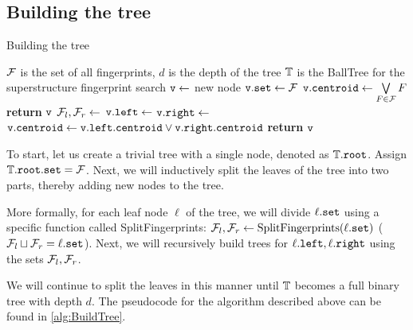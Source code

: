 \subsection{Building the tree}

\begin{algorithm}
  \caption{Building the tree} \label{alg:BuildTree}
  \begin{algorithmic}[1]
    \Require $\mathcal{F}$ is the set of all fingerprints, $d$ is the depth of the tree
    \Ensure $\mathbb{T} $ is the BallTree for the superstructure fingerprint search 
      \State ${\tt v} \gets$ new node
	\State ${\tt v.set} \gets \mathcal{F}$ 
	\State ${\tt v.centroid} \gets \bigvee\limits_{F \in \mathcal{F}} F$ 
	\State \textbf{return} ${\tt v}$ 
      \Else 
        \State $\mathcal{F}_l, \mathcal{F}_r \gets $ 
        \State ${\tt v.left} \gets $  
	\State ${\tt v.right} \gets $ 
	\State ${\tt v.centroid} \gets {\tt v.left.centroid} \lor {\tt v.right.centroid}$ 
        \State \textbf{return} ${\tt v}$ 
      \EndIf
    \EndProcedure
  \end{algorithmic}
\end{algorithm}

To start, let us create a trivial tree with a single node, denoted as $\mathbb{T}.{\tt root}$. Assign $\mathbb{T}.{\tt root.set} = \mathcal{F}$. 
Next, we will inductively split the leaves of the tree into two parts, thereby adding new nodes to the tree.

More formally, for each leaf node $\ell$ of the tree, we will divide $\ell.{\tt set}$ using a specific function called 
SplitFingerprints: $\mathcal{F}_l, \mathcal{F}_r \gets \text{SplitFingerprints}(\ell.{\tt set})$ ($\mathcal{F}_l \sqcup \mathcal{F}_r = \ell.{\tt set}$).
Next, we will recursively build trees for $\ell.{\tt left}, \ell.{\tt right}$ using the sets $\mathcal{F}_l, \mathcal{F}_r$.

We will continue to split the leaves in this manner until $\mathbb{T}$ becomes a full binary tree with depth $d$. The pseudocode 
for the algorithm described above can be found in \ref{alg:BuildTree}.
 


